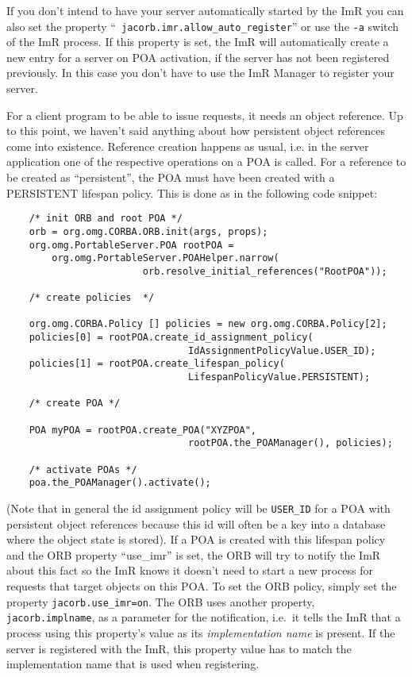 \documentclass[12pt]{scrbook}
\begin{document}
If you don't  intend to have your server  automatically started by the
ImR     you      can     also     set      the     property     ``{\tt
jacorb.imr.allow\_auto\_register}'' or use the  {\tt -a} switch of the
ImR  process. If  this property  is  set, the  ImR will  automatically
create a new  entry for a server on POA activation,  if the server has
not been registered previously. In this case you don't have to use the
ImR Manager to register your server.

For a client program to be  able to issue requests, it needs an object
reference.  Up to  this  point,  we haven't  said  anything about  how
persistent object  references come into  existence. Reference creation
happens as usual, i.e. in the server application one of the respective
operations  on a  POA is  called.  For a  reference to  be created  as
``persistent'',  the POA  must  have been  created  with a  PERSISTENT
lifespan policy. This is done as in the following code snippet:

\small{
\begin{verbatim}
    /* init ORB and root POA */
    orb = org.omg.CORBA.ORB.init(args, props);
    org.omg.PortableServer.POA rootPOA = 
        org.omg.PortableServer.POAHelper.narrow(
                        orb.resolve_initial_references("RootPOA"));

    /* create policies  */

    org.omg.CORBA.Policy [] policies = new org.omg.CORBA.Policy[2];
    policies[0] = rootPOA.create_id_assignment_policy(
                                IdAssignmentPolicyValue.USER_ID);
    policies[1] = rootPOA.create_lifespan_policy(
                                LifespanPolicyValue.PERSISTENT);

    /* create POA */

    POA myPOA = rootPOA.create_POA("XYZPOA", 
                                rootPOA.the_POAManager(), policies);

    /* activate POAs */                              
    poa.the_POAManager().activate();

\end{verbatim}
}

(Note that in general the  id assignment policy will be {\tt USER\_ID}
for a POA with persistent object references because this id will often
be a key into  a database where the object state is  stored). If a POA
is created with this lifespan policy and the ORB property ``use\_imr''
is set, the ORB will try to  notify the ImR about this fact so the ImR
knows it doesn't need to start  a new process for requests that target
objects on this  POA.  To set the ORB policy,  simply set the property
{\tt  jacorb.use\_imr=on}.   The   ORB  uses  another  property,  {\tt
jacorb.implname}, as  a parameter for the  notification, i.e.~it tells
the  ImR  that a  process  using this  property's  value  as its  {\em
implementation name} is present. If  the server is registered with the
ImR, this property value has  to match the implementation name that is
used when registering.
\end{document}

